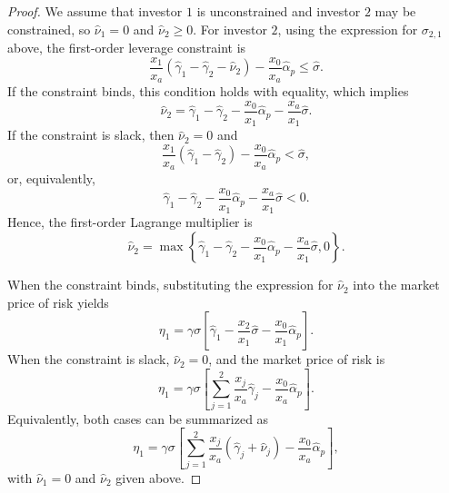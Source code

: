 \begin{proof}
We assume that investor $1$ is unconstrained and investor $2$ may be constrained, so $\hat{\nu}_1=0$ and $\hat{\nu}_2\geq 0$.
For investor $2$, using the expression for $\sigma_{2,1}$ above, the first-order leverage constraint is
\begin{equation}
    \frac{x_1}{x_a}\left(\hat{\gamma}_1 - \hat{\gamma}_2 - \hat{\nu}_{2}\right) -\frac{x_0}{x_a}\hat{\alpha}_{p} \leq \hat{\sigma}.
\end{equation}
If the constraint binds, this condition holds with equality, which implies
\begin{equation}
    \hat{\nu}_{2} = \hat{\gamma}_1-
    \hat{\gamma}_2 -\frac{x_0}{x_1}\hat{\alpha}_{p} -\frac{x_a}{x_1} \hat{\sigma}.
\end{equation}
If the constraint is slack, then $\hat{\nu}_{2}=0$ and
\begin{equation}
    \frac{x_1}{x_a}\left(\hat{\gamma}_1 - \hat{\gamma}_2 \right) -\frac{x_0}{x_a}\hat{\alpha}_{p} < \hat{\sigma},
\end{equation}
or, equivalently,
\begin{equation}
    \hat{\gamma}_1-\hat{\gamma}_2 -\frac{x_0}{x_1}\hat{\alpha}_{p} -\frac{x_a}{x_1} \hat{\sigma} <0.
\end{equation}
Hence, the first-order Lagrange multiplier is
\begin{equation}
    \hat{\nu}_{2} = \max\left\{ \hat{\gamma}_1-\hat{\gamma}_2 -\frac{x_0}{x_1}\hat{\alpha}_{p} -\frac{x_a}{x_1} \hat{\sigma}, 0 \right\}.
\end{equation}

When the constraint binds, substituting the expression for $\hat{\nu}_2$ into the market price of risk yields
\begin{equation}
    \eta_1 = \gamma \sigma \left[\hat{\gamma}_1 - \frac{x_2}{x_1}\hat{\sigma}  -\frac{x_0}{x_1}\hat{\alpha}_{p}  \right].
\end{equation}
When the constraint is slack, $\hat{\nu}_2=0$, and the market price of risk is
\begin{equation}
    \eta_1  =  \gamma \sigma \left[\sum_{j=1}^2 \frac{x_j}{x_a} \hat{\gamma}_j -\frac{x_0}{x_a}\hat{\alpha}_{p} \right].
\end{equation}
Equivalently, both cases can be summarized as
\begin{equation}
    \eta_1 = \gamma \sigma \left[\sum_{j=1}^2 \frac{x_j}{x_a}(\hat{\gamma}_j+ \hat{\nu}_{j}) -\frac{x_0}{x_a}\hat{\alpha}_{p} \right],
\end{equation}
with $\hat{\nu}_1=0$ and $\hat{\nu}_2$ given above.


\end{proof}
